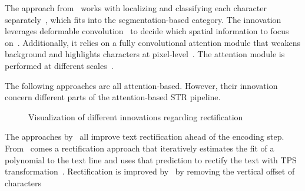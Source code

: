 The approach from~\cite{liao_scene_2018} works with localizing and classifying each character
separately~\citep{liao_scene_2018}, which fits into the segmentation-based category.
The innovation leverages deformable convolution~\citep{dai_deformable_2017} to decide
which spatial information to focus on~\citep{liao_scene_2018}.
Additionally, it relies on a fully convolutional attention module that weakens background and
highlights characters at pixel-level~\citep{liao_scene_2018}.
The attention module is performed at different scales~\citep{liao_scene_2018,xu_show_2016}.

The following approaches are all attention-based.
However, their innovation concern different parts of the attention-based \ac{STR} pipeline.
\begin{figure}[b]
    \centering\scriptsize
    \caption{%
        Visualization of different innovations regarding
        rectification\label{fig:rectification-examples}
    }
\end{figure}
The approaches by~\cite{zhan_esir_2019,luo_multi-object_2019,shi_aster_2019} all improve
text rectification ahead of the encoding step.
From~\cite{zhan_esir_2019} comes a rectification approach that iteratively estimates the fit of a
polynomial to the text line and uses that prediction to rectify the text with \ac{TPS}
transformation~\citep{bookstein_principal_1989,zhan_esir_2019}.
Rectification is improved by~\cite{luo_multi-object_2019} by removing the vertical offset of characters

